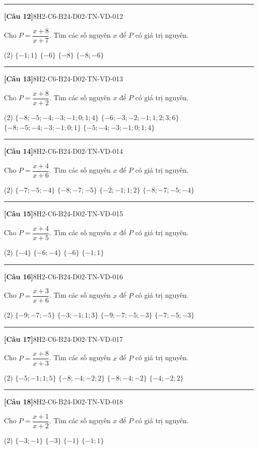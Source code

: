 \documentclass[12pt,a4paper]{article}
\newif\ifloigiai
\newenvironment{cauhoi}[2]{%
  \par\medskip\noindent\rule{\textwidth}{0.4pt}\par\nopagebreak
  \noindent\textbf{[#1]}\hfill{\scriptsize\ttfamily #2}\par\nopagebreak\smallskip}{\par}
\newcommand{\dapan}[1]{\ifloigiai\par\smallskip\noindent\textit{Đáp án:} \textbf{#1}\par\fi}
\begin{document}
\begin{cauhoi}{Câu 12}{8H2-C6-B24-D02-TN-VD-012}
Cho $P=\dfrac{x+8}{x+7}$. Tìm các số nguyên $x$ để $P$ có giá trị nguyên.
\begin{tasks}(2)
\task $\{-1; 1\}$
\task $\{-6\}$
\task $\{-8\}$
\task $\{-8; -6\}$
\end{tasks}
\dapan{D}
\end{cauhoi}
\begin{cauhoi}{Câu 13}{8H2-C6-B24-D02-TN-VD-013}
Cho $P=\dfrac{x+8}{x+2}$. Tìm các số nguyên $x$ để $P$ có giá trị nguyên.
\begin{tasks}(2)
\task $\{-8; -5; -4; -3; -1; 0; 1; 4\}$
\task $\{-6; -3; -2; -1; 1; 2; 3; 6\}$
\task $\{-8; -5; -4; -3; -1; 0; 1\}$
\task $\{-5; -4; -3; -1; 0; 1; 4\}$
\end{tasks}
\dapan{A}
\end{cauhoi}
\begin{cauhoi}{Câu 14}{8H2-C6-B24-D02-TN-VD-014}
Cho $P=\dfrac{x+4}{x+6}$. Tìm các số nguyên $x$ để $P$ có giá trị nguyên.
\begin{tasks}(2)
\task $\{-7; -5; -4\}$
\task $\{-8; -7; -5\}$
\task $\{-2; -1; 1; 2\}$
\task $\{-8; -7; -5; -4\}$
\end{tasks}
\dapan{D}
\end{cauhoi}
\begin{cauhoi}{Câu 15}{8H2-C6-B24-D02-TN-VD-015}
Cho $P=\dfrac{x+4}{x+5}$. Tìm các số nguyên $x$ để $P$ có giá trị nguyên.
\begin{tasks}(2)
\task $\{-4\}$
\task $\{-6; -4\}$
\task $\{-6\}$
\task $\{-1; 1\}$
\end{tasks}
\dapan{B}
\end{cauhoi}
\begin{cauhoi}{Câu 16}{8H2-C6-B24-D02-TN-VD-016}
Cho $P=\dfrac{x+3}{x+6}$. Tìm các số nguyên $x$ để $P$ có giá trị nguyên.
\begin{tasks}(2)
\task $\{-9; -7; -5\}$
\task $\{-3; -1; 1; 3\}$
\task $\{-9; -7; -5; -3\}$
\task $\{-7; -5; -3\}$
\end{tasks}
\dapan{C}
\end{cauhoi}
\begin{cauhoi}{Câu 17}{8H2-C6-B24-D02-TN-VD-017}
Cho $P=\dfrac{x+8}{x+3}$. Tìm các số nguyên $x$ để $P$ có giá trị nguyên.
\begin{tasks}(2)
\task $\{-5; -1; 1; 5\}$
\task $\{-8; -4; -2; 2\}$
\task $\{-8; -4; -2\}$
\task $\{-4; -2; 2\}$
\end{tasks}
\dapan{B}
\end{cauhoi}
\begin{cauhoi}{Câu 18}{8H2-C6-B24-D02-TN-VD-018}
Cho $P=\dfrac{x+1}{x+2}$. Tìm các số nguyên $x$ để $P$ có giá trị nguyên.
\begin{tasks}(2)
\task $\{-3; -1\}$
\task $\{-3\}$
\task $\{-1\}$
\task $\{-1; 1\}$
\end{tasks}
\dapan{A}
\end{cauhoi}
\end{document}
